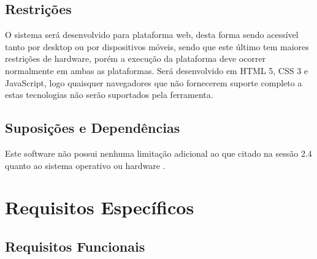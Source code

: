 \documentclass[12pt,a4paper,onecolumn,titlepage]{article}
\begin{document}
\subsection{Restrições}

O sistema será desenvolvido para plataforma web, desta forma sendo acessível tanto por desktop ou por dispositivos móveis, sendo que este último tem maiores restrições de hardware, porém a execução da plataforma deve ocorrer
normalmente em ambas as plataformas. Será desenvolvido em HTML 5, CSS 3 e JavaScript, logo quaisquer navegadores que não fornecerem suporte completo a estas tecnologias não serão suportados pela ferramenta.\\

\subsection{Suposições e Dependências}

Este software não possui nenhuma limitação adicional ao que citado na sessão 2.4 quanto ao sistema operativo ou hardware .

\section{Requisitos Específicos}
\label{sect:requisitos}

\subsection{Requisitos Funcionais}
\end{document}
